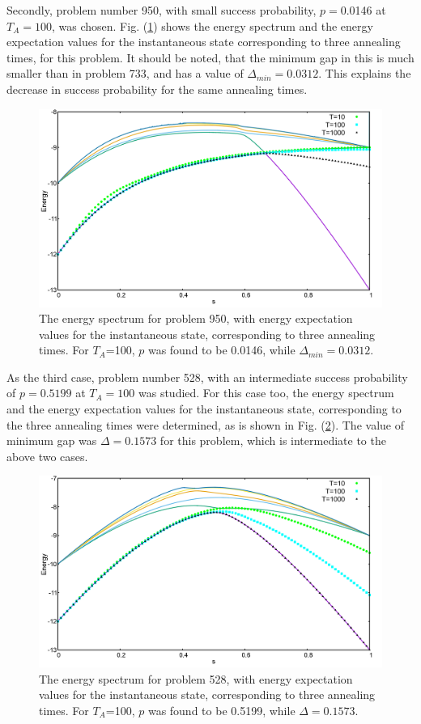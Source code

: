 \documentclass[../main.tex]{subfiles}
\begin{document}
Secondly, problem number 950, with small success probability, $p= $0.0146 at $T_A=100$, was chosen. Fig. (\ref{fig:o3}) shows the energy spectrum and the energy expectation values for the instantaneous state corresponding to three annealing times, for this problem. It should be noted, that the minimum gap in this is much smaller than in problem 733, and has a value of $\Delta_{min} = 0.0312$. This explains the decrease in success probability for the same annealing times.\\
\begin{figure}[H]
\centering 
\includegraphics[scale=0.24]{950_s12_O.png}
\caption{The energy spectrum for problem 950, with energy expectation values for the instantaneous state, corresponding to three annealing times. For $T_A$=100, $p$ was found to be 0.0146, while $\Delta_{min}=0.0312.$}
\label{fig:o3}
\end{figure}


As the third case, problem number 528, with an intermediate success probability of $p=0.5199$ at $T_A= 100$ was studied. For this case too, the energy spectrum and the energy expectation values for the instantaneous state, corresponding to the three annealing times were determined, as is shown in Fig. (\ref{fig:o4}). The value of minimum gap was $\Delta=0.1573$ for this problem, which is intermediate to the above two cases. 
\begin{figure}[H]
\centering 
\includegraphics[scale=0.24]{528_s12_O.png}
\caption{The energy spectrum for problem 528, with energy expectation values for the instantaneous state, corresponding to three annealing times. For $T_A$=100, $p$ was found to be 0.5199, while $\Delta=0.1573.$}
\label{fig:o4}
\end{figure}
\end{document}

